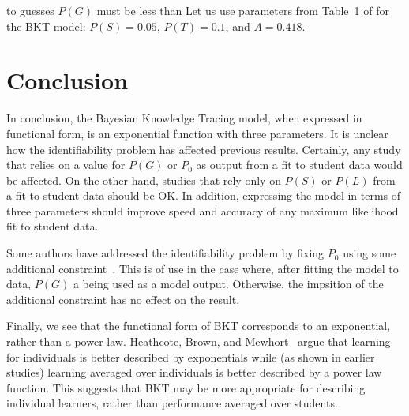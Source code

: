 \documentclass[11pt,letterpaper]{article}
\begin{document}
to guesses $P(G)$ must be less than 
Let us use parameters from Table~1 of
\cite{beck_identifiability:_2007} for the BKT model: 
$P(S)=0.05$, $P(T)=0.1$, and $A=0.418$.

\section{Conclusion}

In conclusion, the Bayesian Knowledge Tracing model, when expressed
in functional form, is an exponential function with three parameters.
It is unclear how the identifiability problem has affected previous
results.  Certainly, any study that relies on a value for $P(G)$ or
$P_0$ as output from a fit to student data would be affected.
On the other hand, studies that rely only on $P(S)$ or $P(L)$ from
a fit to student data should be OK.  In addition, expressing
the model in terms of three parameters should improve speed
and accuracy of any maximum likelihood fit to student data.

Some authors have addressed the identifiability problem by 
%
fixing $P_0$ using some additional constraint~\cite{fix}.  
This is of use in the case where, after fitting the model to data, 
$P(G)$ a being used as a model output.  Otherwise, the impsition
of the additional constraint has no effect on the result.


Finally, we see that the functional form of BKT corresponds 
to an exponential, rather than a power law.  
Heathcote, Brown, and Mewhort~\cite{heathcote_power_2000}
argue that learning for individuals is better described by
exponentials while (as shown in earlier studies) learning averaged
over individuals is better described by a power law function.
This suggests that BKT may be more appropriate for describing
individual learners, rather than performance averaged over students.
\end{document}
